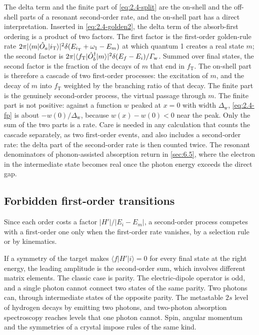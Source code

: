 The delta term and the finite part of \cref{eq:2.4-split} are the on-shell and the off-shell parts of a resonant second-order rate, and the on-shell part has a direct interpretation. Inserted in \cref{eq:2.4-golden2}, the delta term of the absorb-first ordering is a product of two factors. The first factor is the first-order golden-rule rate $2\pi|\langle m|\hat{O}_a|i_{\mathrm{T}}\rangle|^2\delta(E_{i_{\mathrm{T}}} + \omega_1 - E_m)$ at which quantum 1 creates a real state $m$; the second factor is $2\pi|\langle f_{\mathrm{T}}|\hat{O}_b^\dagger|m\rangle|^2\delta(E_f - E_i)/\varGamma_{\mathrm{w}}$. Summed over final states, the second factor is the fraction of the decays of $m$ that end in $f_{\mathrm{T}}$. The on-shell part is therefore a cascade of two first-order processes: the excitation of $m$, and the decay of $m$ into $f_{\mathrm{T}}$ weighted by the branching ratio of that decay. The finite part is the genuinely second-order process, the virtual passage through $m$. The finite part is not positive: against a function $w$ peaked at $x = 0$ with width $\Delta_{\mathrm{w}}$, \cref{eq:2.4-fp} is about $-w(0)/\Delta_{\mathrm{w}}$, because $w(x) - w(0) < 0$ near the peak. Only the sum of the two parts is a rate. Care is needed in any calculation that counts the cascade separately, as two first-order events, and also includes a second-order rate: the delta part of the second-order rate is then counted twice. The resonant denominators of phonon-assisted absorption return in \cref{sec:6.5}, where the electron in the intermediate state becomes real once the photon energy exceeds the direct gap.

\subsection{Forbidden first-order transitions}

Since each order costs a factor $|H'|/|E_i - E_m|$, a second-order process competes with a first-order one only when the first-order rate vanishes, by a selection rule or by kinematics.

If a symmetry of the target makes $\langle f|H'|i\rangle = 0$ for every final state at the right energy, the leading amplitude is the second-order sum, which involves different matrix elements. The classic case is parity. The electric-dipole operator is odd, and a single photon cannot connect two states of the same parity. Two photons can, through intermediate states of the opposite parity. The metastable $2s$ level of hydrogen decays by emitting two photons, and two-photon absorption spectroscopy reaches levels that one photon cannot. Spin, angular momentum and the symmetries of a crystal impose rules of the same kind.

